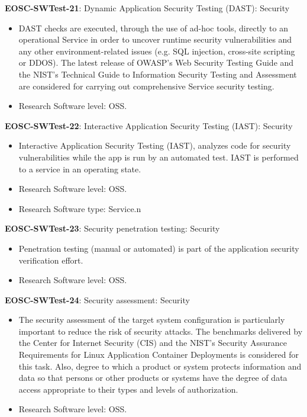 \textbf{EOSC-SWTest-21}: Dynamic Application Security Testing (DAST): Security

\begin{itemize}
    \item DAST checks are executed, through the use of ad-hoc tools, directly to an operational Service in order to uncover runtime security vulnerabilities and any other environment-related issues (e.g. SQL injection, cross-site scripting or DDOS). The latest release of OWASP's Web Security Testing Guide and the NIST's Technical Guide to Information Security Testing and Assessment are considered for carrying out comprehensive Service security testing. \cite{orviz_fernandez_eosc-synergy_2020}
    \item Research Software level: OSS.
\end{itemize}

\textbf{EOSC-SWTest-22}: Interactive Application Security Testing (IAST): Security

\begin{itemize}
    \item Interactive Application Security Testing (IAST), analyzes code for security vulnerabilities while the app is run by an automated test. IAST is performed to a service in an operating state. \cite{orviz_fernandez_eosc-synergy_2020}
    \item Research Software level: OSS.
    \item Research Software type: Service.n\end{itemize}

\textbf{EOSC-SWTest-23}: Security penetration testing: Security

\begin{itemize}
    \item Penetration testing (manual or automated) is part of the application security verification effort. \cite{orviz_fernandez_eosc-synergy_2020}
    \item Research Software level: OSS.
\end{itemize}

\textbf{EOSC-SWTest-24}: Security assessment: Security

\begin{itemize}
    \item The security assessment of the target system configuration is particularly important to reduce the risk of security attacks. The benchmarks delivered by the Center for Internet Security (CIS) and the NIST's Security Assurance Requirements for Linux Application Container Deployments is considered for this task. Also, degree to which a product or system protects information and data so that persons or other products or
systems have the degree of data access appropriate to their types and levels of authorization. \cite{iso_25010_2011_2017,orviz_fernandez_eosc-synergy_2020}
    \item Research Software level: OSS.
\end{itemize}

